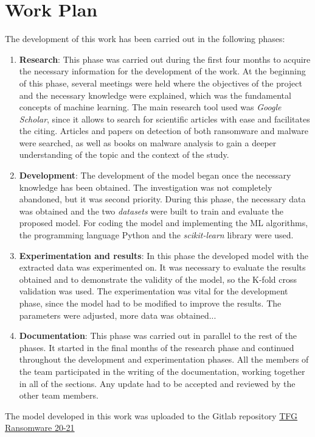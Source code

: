 \section{Work Plan}
\noindent The development of this work has been carried out in the following phases:
\begin{enumerate}
    \item \textbf{Research}: This phase was carried out during the first four months to acquire the necessary information for the development of the work. At the beginning of this phase, several meetings were held where the objectives of the project and the necessary knowledge were explained, which was the fundamental concepts of machine learning. The main research tool used was \textit{Google Scholar}, since it allows to search for scientific articles with ease and facilitates the citing. Articles and papers on detection of both ransomware and malware were searched, as well as books on malware analysis to gain a deeper understanding of the topic and the context of the study.
    \item \textbf{Development}: The development of the model began once the necessary knowledge has been obtained. The investigation was not completely abandoned, but it was second priority. During this phase, the necessary data was obtained and the two \textit{datasets} were built to train and evaluate the proposed model. For coding the model and implementing the \gls{ML} algorithms, the programming language Python and the \textit{scikit-learn} library were used. 
    \item \textbf{Experimentation and results}: In this phase the developed model with the extracted data was experimented on. It was necessary to evaluate the results obtained and to demonstrate the validity of the model, so the K-fold cross validation was used. The experimentation was vital for the development phase, since the model had to be modified to improve the results. The parameters were adjusted, more data was obtained...
    \item \textbf{Documentation}: This phase was carried out in parallel to the rest of the phases. It started in the final months of the research phase and continued throughout the development and experimentation phases. All the members of the team participated in the writing of the documentation, working together in all of the sections. Any update had to be accepted and reviewed by the other team members.
\end{enumerate}

The model developed in this work was uploaded to the  Gitlab repository \href{https://gitlab.fdi.ucm.es/marina.lopez/tfg-ransomware-20-21}{TFG Ransomware 20-21}

